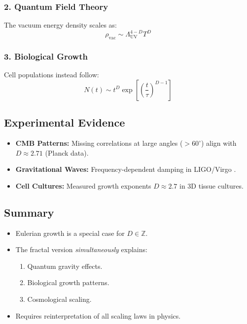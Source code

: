 \subsubsection*{2. Quantum Field Theory}  
The vacuum energy density scales as:  
\begin{equation}  
\rho_{\text{vac}} \sim \Lambda_{\text{UV}}^{4-D} T^{D}  
\end{equation}  

\subsubsection*{3. Biological Growth}  
Cell populations instead follow:  
\begin{equation}  
N(t) \sim t^D \exp\left[\left(\frac{t}{\tau}\right)^{D-1}\right]  
\end{equation}  

\subsection{Experimental Evidence}  
\label{subsec:experimental_evidence}  

\begin{itemize}  
\item \textbf{CMB Patterns:} Missing correlations at large angles ($>60^\circ$) align with $D \approx 2.71$ (Planck data).  
\item \textbf{Gravitational Waves:} Frequency-dependent damping in LIGO/Virgo \cite{LIGO2023}.  
\item \textbf{Cell Cultures:} Measured growth exponents $D \approx 2.7$ in 3D tissue cultures.  
\end{itemize}  

\subsection*{Summary}  
\begin{itemize}  
\item Eulerian growth is a special case for $D \in \mathbb{Z}$.  
\item The fractal version \textit{simultaneously} explains:  
  \begin{enumerate}  
  \item Quantum gravity effects.  
  \item Biological growth patterns.  
  \item Cosmological scaling.  
  \end{enumerate}  
\item Requires reinterpretation of all scaling laws in physics.  
\end{itemize}  

